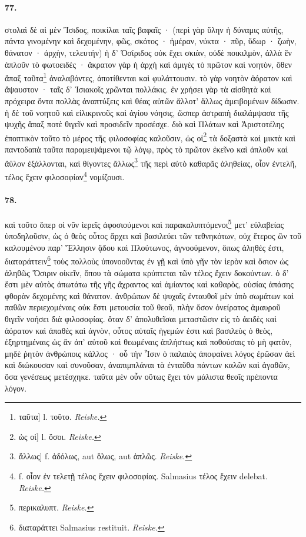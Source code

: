 \documentclass[a4paper, 11pt, oneside, polutonikogreek, german, landscape]{article}
\begin{document}
\paragraph{77.}
στολαὶ δὲ αἱ μὲν Ἴσιδος, ποικίλαι ταῖς βαφαῖς · (περὶ γὰρ ὕλην ἡ δύναμις αὐτῆς, πάντα γινομένην καὶ δεχομένην, φῶς, σκότος · ἡμέραν, νύκτα · πῦρ, ὕδωρ · ζωὴν, θάνατον · ἀρχὴν, τελευτήν) ἡ δ' Ὀσίριδος οὐκ ἔχει σκιὰν, οὐδὲ ποικιλμὸν, ἀλλὰ ἓν ἁπλοῦν τὸ φωτοειδές · ἄκρατον γὰρ ἡ ἀρχὴ καὶ ἀμιγὲς τὸ πρῶτον καὶ νοητὸν, ὅθεν ἅπαξ ταῦτα\footnote{ταῦτα] l. τοῦτο. \emph{Reiske.}} ἀναλαβόντες, ἀποτίθενται καὶ φυλάττουσιν. τὸ γὰρ νοητὸν ἀόρατον καὶ ἄψαυστον · ταῖς δ' Ἰσιακοῖς χρῶνται πολλάκις. ἐν χρήσει γὰρ τὰ αἰσθητὰ καὶ πρόχειρα ὄντα πολλὰς ἀναπτύξεις καὶ θέας αὑτῶν ἄλλοτ' ἄλλως ἀμειβομένων δίδωσιν. ἡ δὲ τοῦ νοητοῦ καὶ εἰλικρινοῦς καὶ ἁγίου νόησις, ὥσπερ ἀστραπὴ διαλάμψασα τῆς ψυχῆς ἅπαξ ποτὲ θιγεῖν καὶ προσιδεῖν προσέσχε. διὸ καὶ Πλάτων καὶ Ἀριστοτέλης ἐποπτικὸν τοῦτο τὸ μέρος τῆς φιλοσοφίας καλοῦσιν, ὡς οἱ\footnote{ὡς οἱ] l. ὅσοι. \emph{Reiske.}} τὰ δοξαστὰ καὶ μικτὰ καὶ παντοδαπὰ ταῦτα παραμειψάμενοι τῷ λόγῳ, πρὸς τὸ πρῶτον ἐκεῖνο καὶ ἁπλοῦν καὶ ἄϋλον ἐξάλλονται, καὶ θίγοντες ἄλλως\footnote{ἄλλως] f. ἀδόλως, aut ὅλως, aut ἁπλῶς. \emph{Reiske.} } τῆς περὶ αὐτὸ καθαρᾶς ἀληθείας, οἷον ἐντελῆ, τέλος ἔχειν φιλοσοφίαν\footnote{f. οἷον ἐν τελετῇ τέλος ἔχειν φιλοσοφίας. Salmasius τέλος ἔχειν delebat. \emph{Reiske.}} νομίζουσι.

\paragraph{78.}
καὶ τοῦτο ὅπερ οἱ νῦν ἱερεῖς ἀφοσιούμενοι καὶ παρακαλυπτόμενοι\footnote{περικαλυπτ. \emph{Reiske.}} μετ' εὐλαβείας ὑποδηλοῦσιν, ὡς ὁ θεὸς οὗτος ἄρχει καὶ βασιλεύει τῶν τεθνηκότων, οὐχ ἕτερος ὢν τοῦ καλουμένου παρ' Ἕλλησιν ᾅδου καὶ Πλούτωνος, ἀγνοούμενον, ὅπως ἀληθές ἐστι, διαταράττειν\footnote{διαταράττει Salmasius restituit. \emph{Reiske.}} τοὺς πολλοὺς ὑπονοοῦντας ἐν γῇ καὶ ὑπὸ γῆν τὸν ἱερὸν καὶ ὅσιον ὡς ἀληθῶς Ὄσιριν οἰκεῖν, ὅπου τὰ σώματα κρύπτεται τῶν τέλος ἔχειν δοκούντων. ὁ δ' ἔστι μὲν αὐτὸς ἀπωτάτω τῆς γῆς ἄχραντος καὶ ἀμίαντος καὶ καθαρὸς, οὐσίας ἁπάσης φθορὰν δεχομένης καὶ θάνατον. ἀνθρώπων δὲ ψυχαῖς ἐνταυθοῖ μὲν ὑπὸ σωμάτων καὶ παθῶν περιεχομέναις οὐκ ἔστι μετουσία τοῦ θεοῦ, πλὴν ὅσον ὀνείρατος ἀμαυροῦ θιγεῖν νοήσει διὰ φιλοσοφίας. ὅταν δ' ἀπολυθεῖσαι μεταστῶσιν εἰς τὸ ἀειδὲς καὶ ἀόρατον καὶ ἀπαθὲς καὶ ἁγνὸν, οὗτος αὐταῖς ἡγεμών ἐστι καὶ βασιλεὺς ὁ θεὸς, ἐξηρτημέναις ὡς ἂν ἀπ' αὐτοῦ καὶ θεωμέναις ἀπλήστως καὶ ποθούσαις τὸ μὴ φατὸν, μηδὲ ῥητὸν ἀνθρώποις κάλλος · οὗ τὴν Ἶσιν ὁ παλαιὸς ἀποφαίνει λόγος ἐρῶσαν ἀεὶ καὶ διώκουσαν καὶ συνοῦσαν, ἀναπιμπλάναι τὰ ἐνταῦθα πάντων καλῶν καὶ ἀγαθῶν, ὅσα γενέσεως μετέσχηκε. ταῦτα μὲν οὖν οὕτως ἔχει τὸν μάλιστα θεοῖς πρέποντα λόγον.
\end{document}
